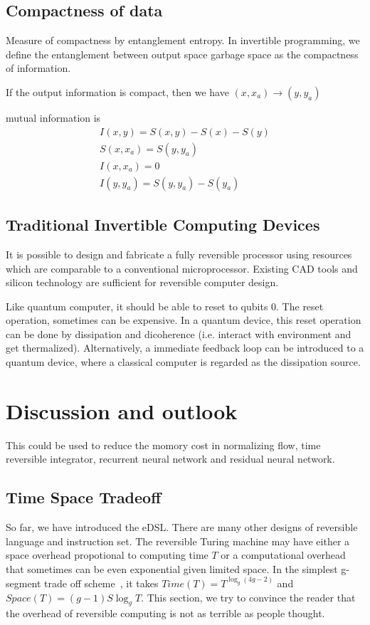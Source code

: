 \documentclass[aps,twocolumn,longbibliography,english,superscriptaddress,prr]{revtex4-1}
\newcommand{\<}{\langle}
\renewcommand{\>}{\rangle}
\theoremstyle{definition}\newtheorem{definition}{\textit{Definition}}
\begin{document}
\subsection{Compactness of data}
Measure of compactness by entanglement entropy.
In invertible programming, we define the entanglement between output space garbage space as the compactness of information.

If the output information is compact, then we have
$(x, x_a)\rightarrow (y, y_a)$

mutual information is
\begin{align}
    I(x, y) = S(x, y) - S(x) - S(y)\\
    S(x, x_a) = S(y, y_a)\\
    I(x, x_a) = 0\\
    I(y, y_a) = S(y, y_a) - S(y_a)
\end{align}

\subsection{Traditional Invertible Computing Devices}
It is possible to design and fabricate a fully reversible processor using resources which are comparable to a conventional microprocessor. Existing CAD tools and silicon technology are sufficient for reversible computer design.

Like quantum computer, it should be able to reset to qubits $0$. The reset operation, sometimes can be expensive. In a quantum device, this reset operation can be done by dissipation and dicoherence (i.e. interact with environment and get thermalized). Alternatively, a immediate feedback loop can be introduced to a quantum device, where a classical computer is regarded as the dissipation source.

\section{Discussion and outlook}

This could be used to reduce the momory cost in normalizing flow, time reversible integrator, recurrent neural network and residual neural network.
\subsection{Time Space Tradeoff}
So far, we have introduced the eDSL. There are many other designs of reversible language and instruction set.
The reversible Turing machine may have either a space overhead propotional to computing time $T$ or a computational overhead that sometimes can be even exponential given limited space.
In the simplest g-segment trade off scheme~\cite{Bennett1989,Levine1990}, it takes $Time(T) = T^{\log _g(4g-2)}$ and $Space(T) = (g-1)S\log_g T$.
This section, we try to convince the reader that the overhead of reversible computing is not as terrible as people thought.
\end{document}
